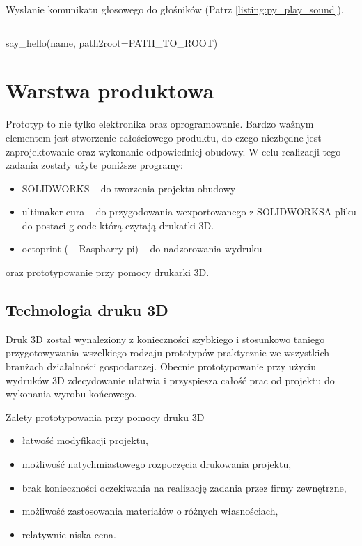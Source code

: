 \documentclass[a4paper,12pt,reqno]{article}
\begin{document}
\newpage
Wysłanie komunikatu głosowego do głośników  (Patrz \ref{listing:py_play_sound}).
\begin{listing}[H]%
\begin{mdframed}[backgroundcolor=codebg]
\inputminted{python}{code/say_hello_play_sound.py}
\end{mdframed}
\caption{say\_hello(name, path2root=PATH\_TO\_ROOT)}
\label{listing:py_play_sound}
\end{listing}

\newpage
\section{Warstwa produktowa} \label{section:warstwa_produkcyjna} %
Prototyp to nie tylko elektronika oraz oprogramowanie. Bardzo ważnym elementem jest stworzenie całościowego produktu, do czego niezbędne jest zaprojektowanie oraz wykonanie odpowiedniej obudowy. W celu realizacji tego zadania zostały użyte poniższe programy:
\begin{itemize}
\item SOLIDWORKS – do tworzenia projektu obudowy
\item ultimaker cura – do przygodowania wexportowanego z SOLIDWORKSA pliku do postaci g-code którą czytają drukatki 3D.
\item octoprint (+ Raspbarry pi) – do nadzorowania wydruku
\end{itemize}
oraz prototypowanie przy pomocy drukarki 3D.
\subsection{Technologia druku 3D}
Druk 3D został wynaleziony z konieczności szybkiego i stosunkowo taniego przygotowywania wszelkiego rodzaju prototypów praktycznie we wszystkich branżach działalności gospodarczej. 
Obecnie prototypowanie przy użyciu wydruków 3D zdecydowanie ułatwia i przyspiesza całość prac od projektu do wykonania wyrobu końcowego.

Zalety prototypowania przy pomocy druku 3D \cite{prototyp3dzalety}
\begin{itemize}
\item łatwość modyfikacji projektu,
\item możliwość natychmiastowego rozpoczęcia drukowania projektu,
\item brak konieczności oczekiwania na realizację zadania przez firmy zewnętrzne,
\item możliwość zastosowania materiałów o różnych własnościach,
\item relatywnie niska cena.
\end{itemize}
\end{document}
